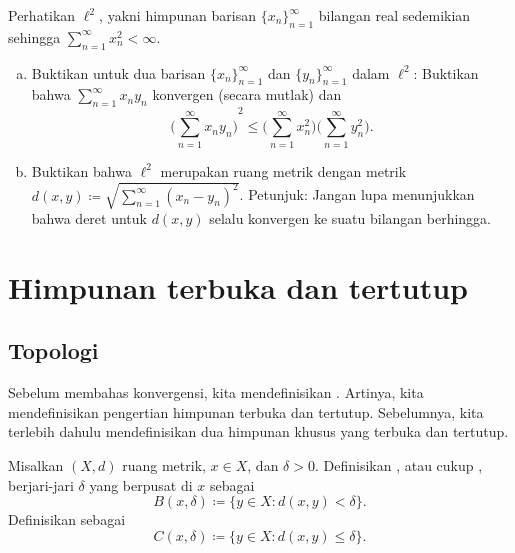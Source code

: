 \begin{samepage}
\begin{exercise}
Perhatikan $\ell^2$, yakni himpunan barisan $\{ x_n \}_{n=1}^\infty$
bilangan real
sedemikian sehingga $\sum_{n=1}^\infty x_n^2 < \infty$.
\begin{enumerate}[a)]
\item
Buktikan  untuk dua barisan
$\{x_n \}_{n=1}^\infty$ dan $\{ y_n \}_{n=1}^\infty$ dalam $\ell^2$:  Buktikan bahwa
$\sum_{n=1}^\infty x_n y_n$ konvergen (secara mutlak) dan
\begin{equation*}
{\biggl( \sum_{n=1}^\infty x_n y_n \biggr)}^2
\leq
\biggl(\sum_{n=1}^\infty x_n^2 \biggr)
\biggl(\sum_{n=1}^\infty y_n^2 \biggr) .
\end{equation*}
\item
Buktikan bahwa $\ell^2$ merupakan ruang metrik dengan metrik
$d(x,y) \coloneqq \sqrt{\sum_{n=1}^\infty {(x_n-y_n)}^2}$.
Petunjuk: Jangan lupa menunjukkan bahwa deret untuk $d(x,y)$ selalu konvergen
ke suatu bilangan berhingga.
\end{enumerate}
\end{exercise}
\end{samepage}


\sectionnewpage
\section{Himpunan terbuka dan tertutup}
\label{sec:mettop}



\subsection{Topologi}

Sebelum membahas konvergensi,
kita mendefinisikan \emph{}.
Artinya,
kita mendefinisikan pengertian himpunan terbuka dan tertutup.
Sebelumnya,
kita terlebih dahulu mendefinisikan dua himpunan khusus yang terbuka dan tertutup.

\begin{defn}
Misalkan $(X,d)$ ruang metrik, $x \in X$, dan $\delta > 0$.  Definisikan
\emph{}, atau cukup \emph{}, berjari-jari $\delta$
yang berpusat di $x$ sebagai
\begin{equation*}
B(x,\delta) \coloneqq \bigl\{ y \in X : d(x,y) < \delta \bigr\} .
\end{equation*}
Definisikan \emph{} sebagai
\begin{equation*}
C(x,\delta) \coloneqq \bigl\{ y \in X : d(x,y) \leq \delta \bigr\} .
\end{equation*}
\end{defn}

